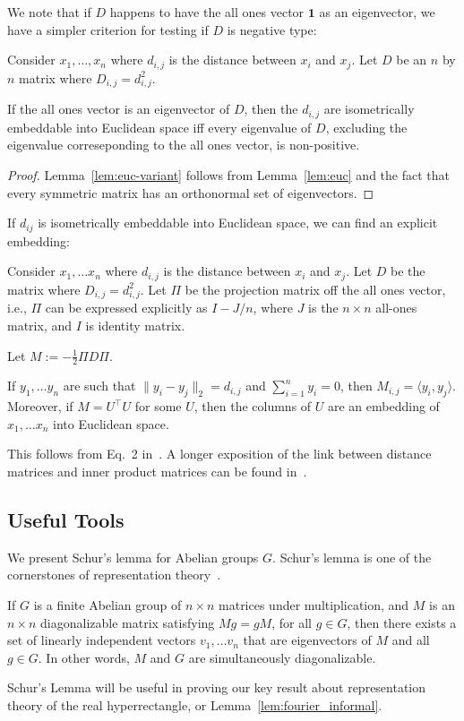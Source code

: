 We note that if $D$ happens to have the all ones vector $\textbf{1}$ as an eigenvector, we have a simpler criterion for testing if $D$ is negative type:

\begin{lemma}\label{lem:euc-variant}  
Consider $x_1,\ldots, x_n$ where $d_{i,j}$ is the distance between $x_i$ and $x_j$.  Let $D$ be an $n$ by $n$
  matrix where $D_{i,j} = d_{i,j}^2$.  
  
  If the all ones vector is an eigenvector of $D$, then the $d_{i,j}$ are
  isometrically embeddable into Euclidean space iff every eigenvalue of $D$, excluding the eigenvalue correseponding to the all ones vector, is non-positive.
\end{lemma}
\begin{proof}
Lemma~\ref{lem:euc-variant} follows from Lemma~\ref{lem:euc} and the fact that every symmetric matrix has an orthonormal set of eigenvectors.
\end{proof}
If $d_{ij}$ is isometrically embeddable into Euclidean space, we can find an
explicit embedding:

\begin{lemma}\label{lem:emb} Consider $x_1, \ldots
  x_n$ where $d_{i,j}$ is the distance between $x_i$ and $x_j$.  Let $D$ be the matrix where $D_{i,j} =
  d^2_{i,j}$. Let $\Pi$ be the projection matrix off the all ones
  vector, i.e., $\Pi$ can be expressed explicitly as $I-J/n$, where $J$ is the $n \times n$ all-ones matrix, and $I$ is
  identity matrix. 
  
  Let $M:=-\frac{1}{2}\Pi D \Pi$.
  
  If $y_1, \ldots y_n$ are such that $\|y_i - y_j\|_2 = d_{i,j}$ and
  $\sum_{i=1}^n y_i = 0$, then $M_{i,j} = \langle y_i, y_j \rangle$.
  Moreover, if $M = U^{\top}U$ for some $U$, then the
  columns of $U$ are an embedding of $x_1, \ldots x_n$ into Euclidean
  space.
\end{lemma}
This follows from Eq.~2 in~\cite{critchley}.  A longer exposition of the link
between distance matrices and inner product matrices can be found
in~\cite{critchley}.



\subsection{Useful Tools}\label{sec:preli:representation}

We present Schur's lemma for Abelian groups $G$. Schur's lemma is one of
the cornerstones of representation theory~\cite{etingof}.

\begin{lemma}\label{lem:known-abelian}  If $G$ is a finite Abelian group of $n \times n$ matrices
  under multiplication, and $M$ is an $n \times n$ diagonalizable matrix
  satisfying $Mg = gM$, for all $g \in G$, then there exists a set of linearly independent vectors $v_1, \ldots v_n$ that are eigenvectors of $M$ and all $g \in G$. In other words, $M$ and $G$ are simultaneously diagonalizable.
\end{lemma}
Schur's Lemma will be useful in proving our key result about representation theory of the real hyperrectangle, or Lemma~\ref{lem:fourier_informal}.

